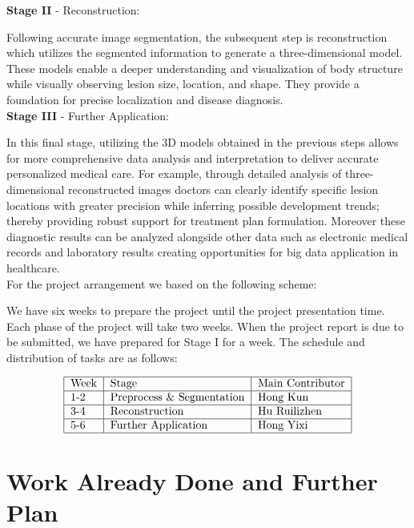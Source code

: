 \documentclass[12pt,a4paper]{report}
\begin{document}
\textbf{Stage II} - Reconstruction:

\qquad Following accurate image segmentation, the subsequent step is reconstruction which utilizes the segmented information to generate a three-dimensional model. These models enable a deeper understanding
and visualization of body structure while visually observing lesion size, location, and shape. They provide a foundation for precise localization and disease diagnosis.\\

\textbf{Stage III} - Further Application:

\qquad In this final stage, utilizing the 3D models obtained in the previous steps allows for more comprehensive data analysis and interpretation to deliver accurate personalized medical care. For example,
through detailed analysis of three-dimensional reconstructed images doctors can clearly identify specific lesion locations with greater precision while inferring possible development trends; thereby providing
robust support for treatment plan formulation. Moreover these diagnostic results can be analyzed alongside other data such as electronic medical records and laboratory results creating opportunities for big
data application in healthcare.\\

For the project arrangement we based on the following scheme:

\qquad We have six weeks to prepare the project until the project presentation time. Each phase of the project will take two weeks. When the project report is due to be submitted, we have prepared for Stage I for a week.
The schedule and distribution of tasks are as follows:

$$
    \begin{tabular}{|l|l|l|}
        \hline
        Week & Stage                      & Main Contributor \\
        \hline
        1-2  & Preprocess \& Segmentation & Hong Kun         \\
        \hline
        3-4  & Reconstruction             & Hu Ruilizhen     \\
        \hline
        5-6  & Further Application        & Hong Yixi        \\
        \hline
    \end{tabular}
$$

\section{Work Already Done and Further Plan}
\end{document}

